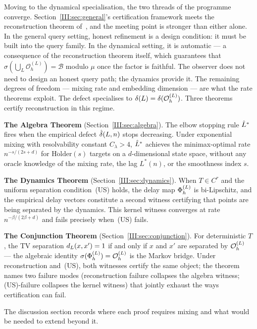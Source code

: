 Moving to the dynamical specialisation, the two threads of the programme
converge.  Section~\ref{III:sec:general}'s certification framework meets the
reconstruction theorem of~\cite{mahon_paper2}, and the meeting point is
stronger than either alone.  In the general query setting, honest refinement
is a design condition: it must be built into the query family.  In the
dynamical setting, it is automatic --- a consequence of the reconstruction
theorem itself, which guarantees that $\sigma(\bigcup_L \mathcal{O}_h^{(L)})
= \mathcal{B}$ modulo $\mu$ once the factor is faithful.  The observer does
not need to design an honest query path; the dynamics provide it.  The
remaining degrees of freedom --- mixing rate and embedding dimension --- are
what the rate theorems exploit.  The defect specialises to
$\delta(L) = \delta(\mathcal{O}_h^{(L)})$.  Three theorems certify
reconstruction in this regime.

\textbf{The Algebra Theorem} (Section~\ref{III:sec:algebra}).
The elbow stopping rule $\hat{L}^*$ fires when the empirical defect
$\hat{\delta}(L,n)$ stops decreasing.
Under exponential mixing with resolvability constant $C_\lambda > 4$,
$\hat{L}^*$ achieves the minimax-optimal rate $n^{-s/(2s+d)}$ for
$\mathrm{H\ddot{o}lder}(s)$ targets on a $d$-dimensional state space,
without any oracle knowledge of the mixing rate, the lag $L^*(n)$,
or the smoothness index $s$.

\textbf{The Dynamics Theorem} (Section~\ref{III:sec:dynamics}).
When $T \in C^r$ and the uniform separation condition~(US) holds,
the delay map $\Phi_h^{(L)}$ is bi-Lipschitz, and the empirical delay vectors
constitute a second witness certifying that points are being separated by
the dynamics.  This kernel witness converges at rate $n^{-\beta/(2\beta+d)}$
and fails precisely when~(US) fails.

\textbf{The Conjunction Theorem} (Section~\ref{III:sec:conjunction}).
For deterministic $T$, the TV separation $d_{L}(x,x') = 1$ if and
only if $x$ and $x'$ are separated by $\mathcal{O}_h^{(L)}$ --- the algebraic identity
$\sigma(\Phi_h^{(L)}) = \mathcal{O}_h^{(L)}$ is the Markov bridge.  Under reconstruction and~(US),
both witnesses certify the same object; the theorem names two failure modes
(reconstruction failure collapses the algebra witness; (US)-failure collapses
the kernel witness) that jointly exhaust the ways certification can fail.

The discussion section records where each proof requires mixing and what
would be needed to extend beyond it.

